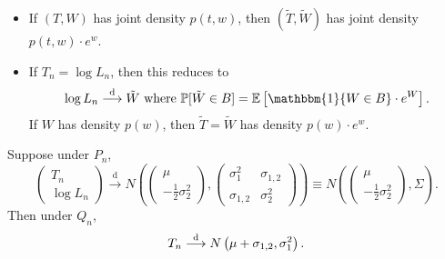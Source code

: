 \documentclass[a4paper]{article}
\begin{document}
\begin{eg}
	\begin{note}
		\quad
		\begin{itemize}
			\item If $(T,W)$ has joint density $p(t,w)$, then $(\tilde{T},\tilde{W})$ has joint density $p(t,w) \cdot e^w$.
			\item If $T_n = \log L_n$, then this reduces to
			\begin{equation*}
				\log L_n \stackrel{\text{d}}{\longrightarrow} \tilde{W} \text{ where } \mathbb{P}[\tilde{W} \in B] =  \mathbb{E}\left[\mathbbm{1}\{W \in B\} \cdot e^W\right].
			\end{equation*}
			If $W$ has density $p(w)$, then $\tilde{T} = \tilde{W}$ has density $p(w) \cdot e^w$.
		\end{itemize}
	\end{note}
	
	\begin{cor}
		Suppose under $P_n$,
		\begin{equation*}
			\begin{pmatrix}
				T_n \\
				\log L_n
			\end{pmatrix} \stackrel{\text{d}}{\longrightarrow}
			N \left(\begin{pmatrix}
				\mu \\
				-\frac{1}{2}\sigma_2^2
			\end{pmatrix},
			\begin{pmatrix}
				\sigma_1^2 & \sigma_{1,2} \\
				\sigma_{1,2} & \sigma_2^2
			\end{pmatrix}\right) 
			\equiv N \left(\begin{pmatrix}
			\mu \\
			-\frac{1}{2}\sigma_2^2
			\end{pmatrix}, \Sigma \right).
		\end{equation*}
		Then under $Q_n$,
		\begin{equation*}
			T_n \stackrel{\text{d}}{\longrightarrow} N\left(\mu+\sigma_{1,2},\sigma_1^2\right).\\
		\end{equation*}
	\end{cor}


\end{eg}
\end{document}
